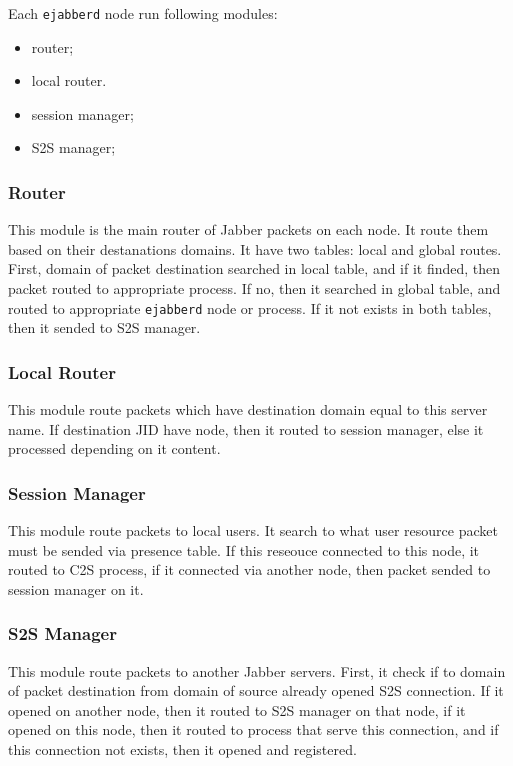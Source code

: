 \documentclass[10pt]{article}
\newcommand{\ejabberd}{\texttt{ejabberd}}
\newcommand{\Jabber}{Jabber}
\begin{document}
Each \ejabberd{} node run following modules:
\begin{itemize}
\item router;
\item local router.
\item session manager;
\item S2S manager;
\end{itemize}


\subsubsection{Router}

This module is the main router of \Jabber{} packets on each node.  It route
them based on their destanations domains.  It have two tables: local and global
routes.  First, domain of packet destination searched in local table, and if it
finded, then packet routed to appropriate process.  If no, then it searched in
global table, and routed to appropriate \ejabberd{} node or process.  If it not
exists in both tables, then it sended to S2S manager.


\subsubsection{Local Router}

This module route packets which have destination domain equal to this server
name.  If destination JID have node, then it routed to session manager, else it
processed depending on it content.


\subsubsection{Session Manager}

This module route packets to local users.  It search to what user resource
packet must be sended via presence table.  If this reseouce connected to this
node, it routed to C2S process, if it connected via another node, then packet
sended to session manager on it.


\subsubsection{S2S Manager}

This module route packets to another \Jabber{} servers.  First, it check if
to domain of packet destination from domain of source already opened S2S
connection.  If it opened on another node, then it routed to S2S manager on
that node, if it opened on this node, then it routed to process that serve this
connection, and if this connection not exists, then it opened and registered.
\end{document}
